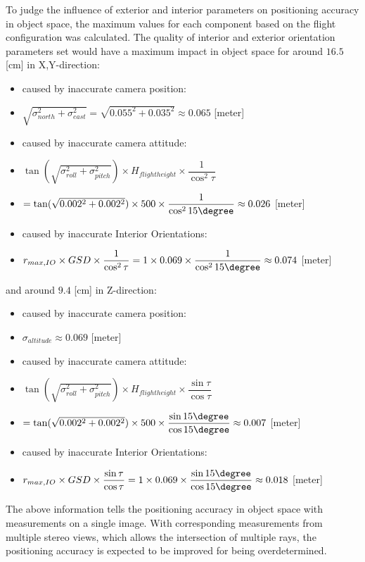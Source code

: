 To judge the influence of exterior and interior parameters on positioning accuracy in object space, the maximum values for each component based on the flight configuration was calculated.
The quality of interior and exterior orientation parameters set would have a maximum impact in object space for around $16.5$ [cm] in X,Y-direction:
\begin{itemize}
      \item caused by inaccurate camera position: 
      \item [] $\sqrt{\sigma_{north}^2+\sigma_{east}^2}=\sqrt{0.055^2+0.035^2}\approx0.065$ [meter]
      \item caused by inaccurate camera attitude:
      \item [] $\tan(\sqrt{\sigma_{roll}^2+\sigma_{pitch}^2})\times H_{flight height}\times\dfrac{1}{\cos^2\tau}$
      \item [] $=\tan(\sqrt{0.002^2+0.002^2})\times 500\times\dfrac{1}{\cos^215\degree}\approx0.026$ [meter]
      \item caused by inaccurate Interior Orientations:
      \item [] $r_{max, IO}\times GSD\times\dfrac{1}{\cos^2\tau}=1\times0.069\times\dfrac{1}{\cos^215\degree}\approx0.074$ [meter]
\end{itemize}
and around $9.4$ [cm] in Z-direction:
\begin{itemize}
      \item caused by inaccurate camera position:
      \item [] $\sigma_{altitude}\approx0.069$ [meter]
      \item caused by inaccurate camera attitude:
      \item [] $\tan(\sqrt{\sigma_{roll}^2+\sigma_{pitch}^2})\times H_{flight height}\times\dfrac{\sin\tau}{\cos\tau}$
      \item [] $=\tan(\sqrt{0.002^2+0.002^2})\times 500\times\dfrac{\sin15\degree}{\cos15\degree}\approx0.007$ [meter]
      \item caused by inaccurate Interior Orientations:
      \item [] $r_{max, IO}\times GSD\times\dfrac{\sin\tau}{\cos\tau}=1\times0.069\times\dfrac{\sin15\degree}{\cos15\degree}\approx0.018$ [meter]
\end{itemize}

The above information tells the positioning accuracy in object space with measurements on a single image. With corresponding measurements from multiple stereo views, which allows the intersection of multiple  rays, the positioning accuracy is expected to be improved for being overdetermined.

